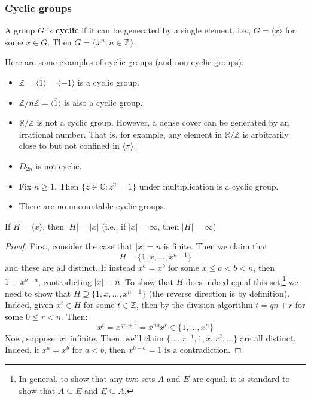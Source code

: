 \documentclass{article}
\theoremstyle{plain}
\newcommand{\R}{\mathbb{R}}
\newcommand{\C}{\mathbb{C}}
\newcommand{\Z}{\mathbb{Z}}
\begin{document}
\subsubsection{Cyclic groups}
\begin{definition}{}{}
A group $G$ is \textbf{cyclic} if it can be generated by a single element, i.e., $G = \langle x \rangle$ for some $x \in G$. Then $G = \{ x^n : n \in \Z \}$.
\end{definition}
Here are some examples of cyclic groups (and non-cyclic groups):
\begin{itemize}
\item $\Z = \langle 1 \rangle = \langle -1 \rangle$ is a cyclic group.
\item $\Z/n\Z = \langle \bar{1} \rangle$ is also a cyclic group.
\item $\R/\Z$ is not a cyclic group. However, a dense cover can be generated by an irrational number. That is, for example, any element in $\R/\Z$ is arbitrarily close to but not confined in $\langle \pi \rangle$.
\item $D_{2n}$ is not cyclic.
\item Fix $n \ge 1$. Then $\{ z \in \C : z^n = 1 \}$ under multiplication is a cyclic group.
\item There are no uncountable cyclic groups.
\end{itemize}

\begin{lemma}{}{}
If $H = \langle x \rangle$, then $|H| = |x|$ (i.e., if $|x| = \infty$, then $|H| = \infty$)
\end{lemma}
\begin{proof}
First, consider the case that $|x| = n$ is finite. Then we claim that $$H = \{ 1,x,\ldots,x^{n-1} \}$$ and these are all distinct. If instead $x^a = x^b$ for some $x \le a < b < n$, then $1=x^{b-a}$, contradicting $|x| = n$. To show that $H$ does indeed equal this set,\footnote{In general, to show that any two sets $A$ and $E$ are equal, it is standard to show that $A \subseteq E$ and $E \subseteq A$.} we need to show that $H \supseteq \{ 1,x,\ldots,x^{n-1} \}$ (the reverse direction is by definition). Indeed, given $x^t \in H$ for some $t \in \Z$, then by the division algorithm $t = qn + r$ for some $0 \le r < n$. Then:
$$x^t = x^{qn+r} = x^{nq} x^r \in \{ 1,\ldots,x^n \}$$
Now, suppose $|x|$ infinite. Then, we'll claim $\{ \ldots, x^{-1},1,x,x^2,\ldots \}$ are all distinct. Indeed, if $x^a = x^b$ for $a < b$, then $x^{b-a} = 1$ is a contradiction.
\end{proof}
\end{document}
